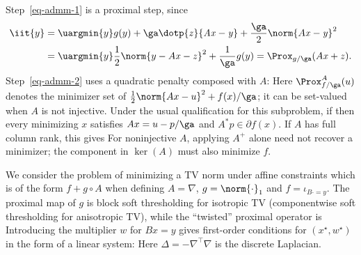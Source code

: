 Step~\eqref{eq-admm-1} is a proximal step, since
\begin{align*}
	\iit{y} &= \uargmin{y} 
	g(y) + \ga \dotp{\it{z}}{A\it{x}-y} + \frac{\ga}{2}\norm{A\it{x}-y}^2
	\\
	&=\uargmin{y} \frac{1}{2}\norm{y - A\it{x} - \it{z}}^2 + \frac{1}{\ga} g(y)
	= \Prox_{g/\ga}( A\it{x} + \it{z} ).
\end{align*}
Step~\eqref{eq-admm-2} uses a quadratic penalty composed with $A$:
Here $\Prox^A_{f/\ga}(u)$ denotes the minimizer set of $\frac12\norm{Ax-u}^2+f(x)/\ga$; it can be set-valued when $A$ is not injective. Under the usual qualification for this subproblem, if
then every minimizing $x$ satisfies $Ax=u-p/\ga$ and $A^*p\in\partial f(x)$. If $A$ has full column rank, this gives
For noninjective $A$, applying $A^+$ alone need not recover a minimizer; the component in $\ker(A)$ must also minimize $f$.

\begin{exmp}
	We consider the problem of minimizing a TV norm under affine constraints
	which is of the form $f + g \circ A$ when defining $A=\nabla$, $g=\norm{\cdot}_1$ and $f=\iota_{B \cdot = y}$. 
	The proximal map of $g$ is block soft thresholding for isotropic TV (componentwise soft thresholding for anisotropic TV), while the ``twisted'' proximal operator is
	Introducing the multiplier $w$ for $Bx=y$ gives first-order conditions for $(x^\star,w^\star)$ in the form of a linear system:
	Here $\Delta=-\nabla^\top \nabla$ is the discrete Laplacian.
\end{exmp}

